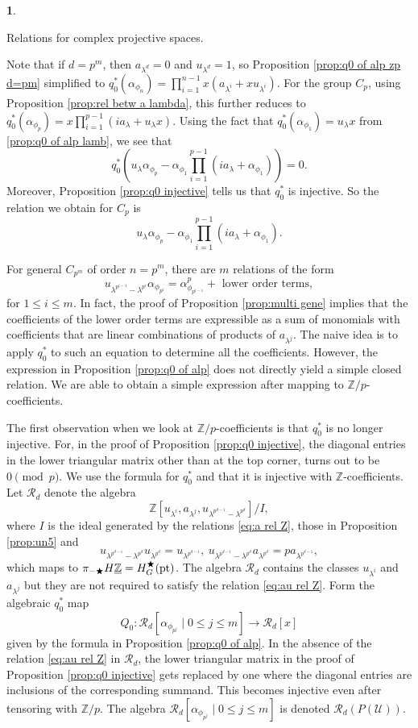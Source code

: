 \documentclass[a4paper,leqno,11pt]{amsart}
\theoremstyle{plain}
\theoremstyle{definition}
\newtheorem{subsec}[theorem]{}
\theoremstyle{remark}
\theoremstyle{definition}
\newcommand{\Z}{{\mathbb{Z}}}
\newcommand\RR{{\mathcal R}}
\newcommand\UU{{\mathcal U}}
\newenvironment{mysubsection}[2][]
{\begin{subsec}\begin{upshape}\begin{bfseries}{#2.}
			\end{bfseries}{#1}}
		{\end{upshape}\end{subsec}}
\newcommand{\uZ}{\underline{\mathbb{Z}}}
\def\Z{\mathbb{Z}}
\def\a{\alpha}
\def\lam{\lambda}
\numberwithin{equation}{section}
\newcommand{\pt}{\textup{pt}}
\begin{document}
\begin{mysubsection}{Relations for complex projective spaces}
	Note that if $ d=p^m $, then $ a_{\lambda^d}=0 $ and $ u_{\lambda^d}=1 $, so Proposition \ref{prop:q0 of alp zp d=pm} simplified to  	$ q_0^*(\a_{\phi_n})=\prod_{i=1}^{n-1}x(a_{\lambda^i}+xu_{\lambda^i})	 $. For the group $ C_p $, using Proposition \ref{prop:rel betw a lambda}, this further reduces  to   $ q_0^*(\a_{\phi_p})=x\prod_{i=1}^{p-1}(ia_{\lam}+ u_{\lam}x) 	 $. Using the fact that $ q_0^*(\alpha_{\phi_1})=u_\lambda x $ from \eqref{prop:q0 of alp lamb}, we see that 
	$$ q_0^*(u_\lambda\alpha_{\phi_p}-\alpha_{\phi_1}\prod_{i=1}^{p-1}(ia_\lambda+\alpha_{\phi_1})) =0.
	$$
	Moreover,  Proposition \ref{prop:q0 injective} tells us that $ q_0^* $ is injective. 
	So the relation we obtain for $ C_p $ is
	\[
	u_\lambda\alpha_{\phi_p}-\alpha_{\phi_1}\prod_{i=1}^{p-1}(ia_\lambda+\alpha_{\phi_1}).
	\]
	\smallskip
	
	For general $C_{p^m}$ of order $n=p^m$, there are $m$ relations of the form 
	\[ u_{\lambda^{p^{i-1}}-\lambda^{p^i}}\alpha_{\phi_{p^i}} = \alpha_{\phi_{p^{i-1}}}^p + \mbox{ lower order terms},\]
	for $1\leq i \leq m$. In fact, the proof of Proposition \ref{prop:multi gene} implies that the coefficients of the lower order terms are expressible as a sum of monomials with coefficients  that are linear combinations of products of $a_{\lambda^j}$. The naive idea is to apply $q_0^\ast$ to such an equation to determine all the coefficients. However,  the expression in Proposition \ref{prop:q0 of alp} does not directly yield a simple closed relation. We are able to obtain a simple expression after mapping to  $\Z/p$-coefficients. 
	
	The first observation when we look at $\Z/p$-coefficients is that $q_0^\ast$ is no longer injective. For, in the proof of Proposition \ref{prop:q0 injective}, the diagonal entries in the lower triangular matrix other than at the top corner, turns out to be $0\pmod{p}$. We use the formula for $q_0^\ast$ and that it is injective with $\Z$-coefficients. Let $\RR_d$ denote the algebra 
	\[ \Z[u_{\lambda^i}, a_{\lambda^j}, u_{\lambda^{p^{d-1}}-\lambda^{p^d}}]/I,\]
where $I$ is the ideal generated by the relations \eqref{eq:a rel Z}, those in Proposition \ref{prop:un5} and	
\[	  u_{\lambda^{p^{d-1}}-\lambda^{p^d}}u_{\lambda^{p^d}}= u_{\lambda^{p^{d-1}}}, ~ u_{\lambda^{p^{d-1}}-\lambda^{p^d}}a_{\lambda^{p^d}}= p a_{\lambda^{p^{d-1}}}, \]
which maps to $\pi_{-\bigstar} H\uZ=H^\bigstar_G(\pt)$. The algebra $\RR_d$ contains the classes $u_{\lambda^i}$ and $a_{\lambda^j}$ but they are not required to satisfy the relation \eqref{eq:au rel Z}.  	Form the algebraic $q_0^\ast$ map 
\[Q_0: \RR_d[\alpha_{\phi_{p^j}}\mid 0\leq j\leq m] \to \RR_d[x]\]
given by the formula in Proposition \ref{prop:q0 of alp}. In the absence of the relation \eqref{eq:au rel Z} in $\RR_d$, the lower triangular matrix in the proof of Proposition \ref{prop:q0 injective} gets replaced by one where the diagonal entries are inclusions of the corresponding summand. This becomes injective even after tensoring with $\Z/p$. The algebra $\RR_d[\alpha_{\phi_{p^j}}\mid 0\leq j\leq m]$ is denoted $\RR_d(P(\UU))$. 


\end{mysubsection}
\end{document}
